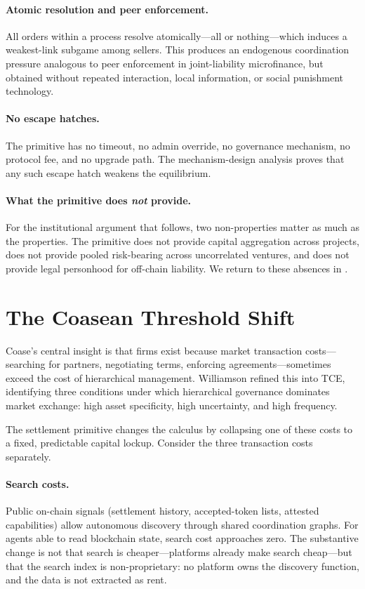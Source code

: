 \documentclass[11pt,a4paper]{article}
\theoremstyle{definition}
\theoremstyle{remark}
\begin{document}
\paragraph{Atomic resolution and peer enforcement.}
All orders within a process resolve atomically---all or
nothing---which induces a weakest-link subgame among sellers.
This produces an endogenous coordination pressure analogous to
peer enforcement in joint-liability microfinance, but obtained
without repeated interaction, local information, or social
punishment technology.

\paragraph{No escape hatches.}
The primitive has no timeout, no admin override, no governance
mechanism, no protocol fee, and no upgrade path. The
mechanism-design analysis proves that any such escape hatch
weakens the equilibrium.

\paragraph{What the primitive does \emph{not} provide.}
For the institutional argument that follows, two non-properties
matter as much as the properties. The primitive does not provide
capital aggregation across projects, does not provide pooled
risk-bearing across uncorrelated ventures, and does not provide
legal personhood for off-chain liability. We return to these
absences in .

\section{The Coasean Threshold Shift}
\label{sec:threshold}

Coase's central insight is that firms exist because market
transaction costs---searching for partners, negotiating terms,
enforcing agreements---sometimes exceed the cost of hierarchical
management. Williamson refined this into TCE, identifying three
conditions under which hierarchical governance dominates market
exchange: high asset specificity, high uncertainty, and high
frequency.

The settlement primitive changes the calculus by collapsing one of
these costs to a fixed, predictable capital lockup. Consider the
three transaction costs separately.

\paragraph{Search costs.}
Public on-chain signals (settlement history, accepted-token lists,
attested capabilities) allow autonomous discovery through shared
coordination graphs. For agents able to read blockchain state,
search cost approaches zero. The substantive change is not that
search is cheaper---platforms already make search cheap---but that
the search index is non-proprietary: no platform owns the discovery
function, and the data is not extracted as rent.
\end{document}
